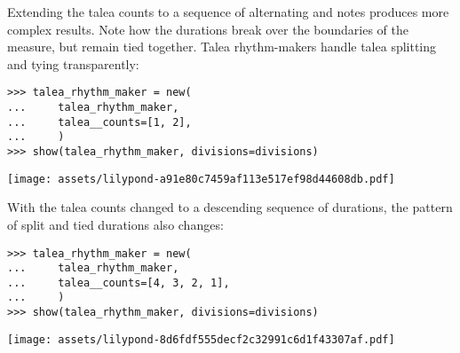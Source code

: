 \noindent Extending the talea counts to a sequence of alternating 
and  notes produces more complex results. Note how the 
durations break over the boundaries of the  measure, but remain
tied together. Talea rhythm-makers handle talea splitting and tying
transparently:

\begin{comment}
<abjad>
talea_rhythm_maker = new(
    talea_rhythm_maker,
    talea__counts=[1, 2],
    )
show(talea_rhythm_maker, divisions=divisions)
</abjad>
\end{comment}

\begin{abjadbookoutput}
\begin{singlespacing}
\vspace{-0.5\baselineskip}
\begin{verbatim}
>>> talea_rhythm_maker = new(
...     talea_rhythm_maker,
...     talea__counts=[1, 2],
...     )
>>> show(talea_rhythm_maker, divisions=divisions)
\end{verbatim}
\noindent\texttt{[image: assets/lilypond-a91e80c7459af113e517ef98d44608db.pdf]}
\end{singlespacing}
\end{abjadbookoutput}

\noindent With the talea counts changed to a descending sequence of durations,
the pattern of split and tied durations also changes:

\begin{comment}
<abjad>
talea_rhythm_maker = new(
    talea_rhythm_maker,
    talea__counts=[4, 3, 2, 1],
    )
show(talea_rhythm_maker, divisions=divisions)
</abjad>
\end{comment}

\begin{abjadbookoutput}
\begin{singlespacing}
\vspace{-0.5\baselineskip}
\begin{verbatim}
>>> talea_rhythm_maker = new(
...     talea_rhythm_maker,
...     talea__counts=[4, 3, 2, 1],
...     )
>>> show(talea_rhythm_maker, divisions=divisions)
\end{verbatim}
\noindent\texttt{[image: assets/lilypond-8d6fdf555decf2c32991c6d1f43307af.pdf]}
\end{singlespacing}
\end{abjadbookoutput}

